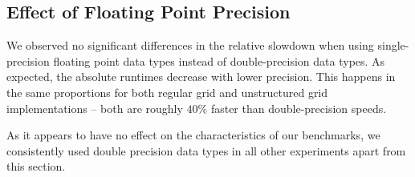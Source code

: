 \subsection{Effect of Floating Point Precision}

We observed no significant differences in the relative slowdown when using single-precision floating point data types instead of double-precision data types. As expected, the absolute runtimes decrease with lower precision. This happens in the same proportions for both regular grid and unstructured grid implementations -- both are roughly $40\%$ faster than double-precision speeds.

As it appears to have no effect on the characteristics of our benchmarks, we consistently used double precision data types in all other experiments apart from this section.